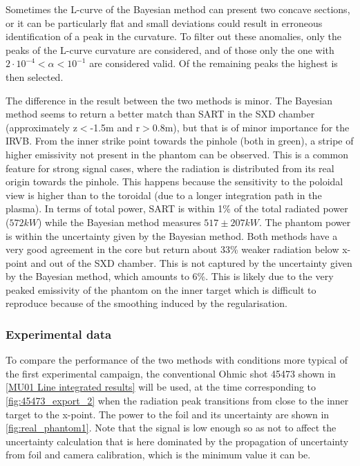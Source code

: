 Sometimes the L-curve of the Bayesian method can present two concave sections, or it can be particularly flat and small deviations could result in erroneous identification of a peak in the curvature. To filter out these anomalies, only the peaks of the L-curve curvature are considered, and of those only the one with $2 \cdot 10^{-4} < \alpha < 10^{-1}$ are considered valid. Of the remaining peaks the highest is then selected.

The difference in the result between the two methods is minor. The Bayesian method seems to return a better match than SART in the SXD chamber (approximately z$<$-1.5m and r$>$0.8m), but that is of minor importance for the IRVB. From the inner strike point towards the pinhole (both in green), a stripe of higher emissivity not present in the phantom can be observed. This is a common feature for strong signal cases, where the radiation is distributed from its real origin towards the pinhole. This happens because the sensitivity to the poloidal view is higher than to the toroidal (due to a longer integration path in the plasma). In terms of total power, SART is within 1\% of the total radiated power ($572kW$) while the Bayesian method measures $517\pm207 kW$. The phantom power is within the uncertainty given by the Bayesian method. Both methods have a very good agreement in the core but return about 33\% weaker radiation below x-point and out of the SXD chamber. This is not captured by the uncertainty given by the Bayesian method, which amounts to 6\%. This is likely due to the very peaked emissivity of the phantom on the inner target which is difficult to reproduce because of the smoothing induced by the regularisation.

\subsubsection{Experimental data}\label{Experimental data}

To compare the performance of the two methods with conditions more typical of the first experimental campaign, the conventional Ohmic shot 45473 shown in \autoref{MU01 Line integrated results} will be used, at the time corresponding to \autoref{fig:45473_export_2} when the radiation peak transitions from close to the inner target to the x-point. The power to the foil and its uncertainty are shown in \autoref{fig:real_phantom1}. Note that the signal is low enough so as not to affect the uncertainty calculation that is here dominated by the propagation of uncertainty from foil and camera calibration, which is the minimum value it can be.


